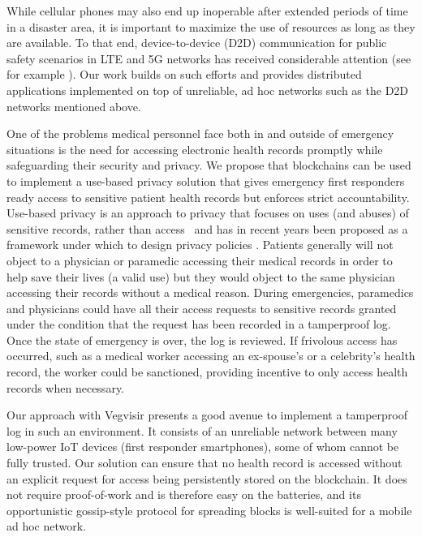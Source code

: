 \documentclass[conference, letterpaper]{IEEEtran}
\begin{document}
While cellular phones may also end up inoperable after extended periods of time in a disaster area, it is important to maximize the use of resources as long as they are available. To that end, device-to-device (D2D) communication for public safety scenarios in LTE and 5G networks has received considerable attention (see for example \cite{fodor2014device, usman2015software, doumi2013lte, yaacoub2012energy}). Our work builds on such efforts and provides distributed applications implemented on top of unreliable, ad hoc networks such as the D2D networks mentioned above.

One of the problems medical personnel face both in and outside of emergency situations is the need for accessing electronic health records promptly while safeguarding their security and privacy. We propose that blockchains can be used to implement a use-based privacy solution that gives emergency first responders ready access to sensitive patient health records but enforces strict accountability. Use-based privacy is an approach to privacy that focuses on uses (and abuses) of sensitive records, rather than access~\cite{cate_principles_2002} and has in recent years been proposed as a framework under which to design privacy policies \cite{cate_data_2013,birrell_reactive_2017}.  Patients generally will not object to a physician or paramedic accessing their medical records in order to help save their lives (a valid use) but they would object to the same physician accessing their records without a medical reason. During emergencies, paramedics and physicians could have all their access requests to sensitive records granted under the condition that the request has been recorded in a tamperproof log. Once the state of emergency is over, the log is reviewed. If frivolous access has occurred, such as a medical worker accessing an ex-spouse's or a celebrity's health record, the worker could be sanctioned, providing incentive to only access health records when necessary.

Our approach with Vegvisir presents a good avenue to implement a tamperproof log in such an environment. It consists of an unreliable network between many low-power IoT devices (first responder smartphones), some of whom cannot be fully trusted. Our solution can ensure that no health record is accessed without an explicit request for access being persistently stored on the blockchain.  It does not require proof-of-work and is therefore easy on the batteries, and its opportunistic gossip-style protocol for spreading blocks is well-suited for a mobile ad hoc network.
\end{document}
